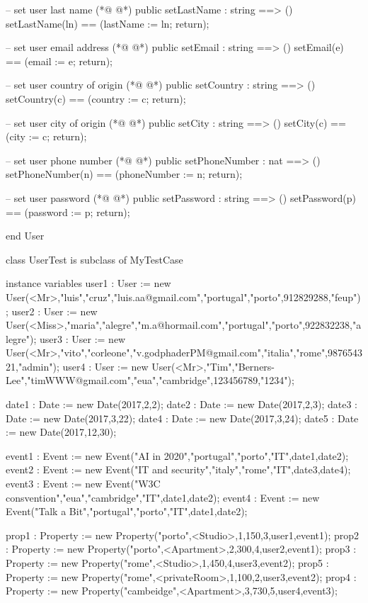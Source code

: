 \begin{vdmpp}[breaklines=true]
 -- set user last name
(*@
\label{setLastName:81}
@*)
 public setLastName : string ==> ()
  setLastName(ln) == (lastName := ln; return);
  
 -- set user email address
(*@
\label{setEmail:85}
@*)
 public setEmail : string ==> ()
  setEmail(e) == (email := e; return);
  
 -- set user country of origin
(*@
\label{setCountry:89}
@*)
 public setCountry : string ==> ()
  setCountry(c) == (country := c; return);
  
 -- set user city of origin
(*@
\label{setCity:93}
@*)
 public setCity : string ==> ()
  setCity(c) == (city := c; return);
  
 -- set user phone number
(*@
\label{setPhoneNumber:97}
@*)
 public setPhoneNumber : nat ==> ()
  setPhoneNumber(n) == (phoneNumber := n; return);
 
 -- set user password
(*@
\label{setPassword:101}
@*)
 public setPassword : string ==> ()
  setPassword(p) == (password := p; return);

end User

class UserTest is subclass of MyTestCase

instance variables
 user1 : User := new User(<Mr>,"luis","cruz","luis.aa@gmail.com","portugal","porto",912829288,"feup");
 user2 : User := new User(<Miss>,"maria","alegre","m.a@hormail.com","portugal","porto",922832238,"alegre");
 user3 : User := new User(<Mr>,"vito","corleone","v.godphaderPM@gmail.com","italia","rome",987654321,"admin");
 user4 : User := new User(<Mr>,"Tim","Berners-Lee","timWWW@gmail.com","eua","cambridge",123456789,"1234");
 
 date1 : Date := new Date(2017,2,2);
 date2 : Date := new Date(2017,2,3);
 date3 : Date := new Date(2017,3,22);
 date4 : Date := new Date(2017,3,24);
 date5 : Date := new Date(2017,12,30);
 
 event1 : Event := new Event("AI in 2020","portugal","porto","IT",date1,date2);
 event2 : Event := new Event("IT and security","italy","rome","IT",date3,date4);
 event3 : Event := new Event("W3C consvention","eua","cambridge","IT",date1,date2);
 event4 : Event := new Event("Talk a Bit","portugal","porto","IT",date1,date2);
 
 prop1 : Property := new Property("porto",<Studio>,1,150,3,user1,event1);
 prop2 : Property := new Property("porto",<Apartment>,2,300,4,user2,event1);
 prop3 : Property := new Property("rome",<Studio>,1,450,4,user3,event2);
 prop5 : Property := new Property("rome",<privateRoom>,1,100,2,user3,event2);
 prop4 : Property := new Property("cambeidge",<Apartment>,3,730,5,user4,event3);


\end{vdmpp}
